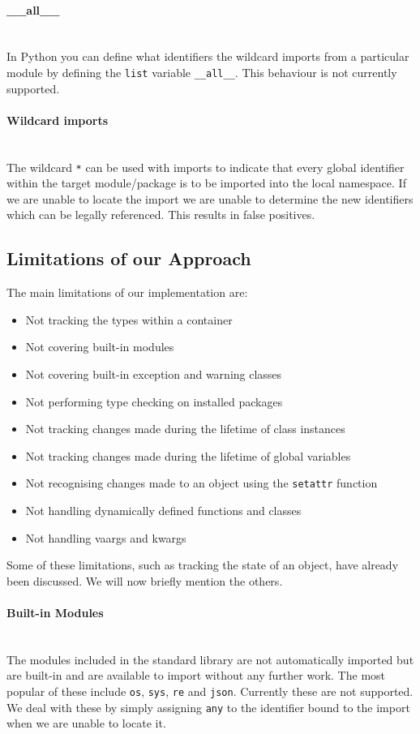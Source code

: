 \documentclass[12pt, titlepage]{article}
\begin{document}
\paragraph*{\_\_all\_\_}\mbox{} \\
In Python you can define what identifiers the wildcard imports from a particular module by defining the \texttt{list} variable \texttt{\_\_all\_\_}. This behaviour is not currently supported.

\paragraph*{Wildcard imports}\mbox{} \\
The wildcard \texttt{*} can be used with imports to indicate that every global identifier within the target module/package is to be imported into the local namespace. If we are unable to locate the import we are unable to determine the new identifiers which can be legally referenced. This results in false positives.


\subsection{Limitations of our Approach}
The main limitations of our implementation are:
\begin{itemize}
	\item Not tracking the types within a container
	\item Not covering built-in modules
	\item Not covering built-in exception and warning classes
	\item Not performing type checking on installed packages
	\item Not tracking changes made during the lifetime of class instances
	\item Not tracking changes made during the lifetime of global variables
	\item Not recognising changes made to an object using the \texttt{setattr} function
	\item Not handling dynamically defined functions and classes
	\item Not handling vaargs and kwargs
\end{itemize}
Some of these limitations, such as tracking the state of an object, have already been discussed. We will now briefly mention the others.

\paragraph*{Built-in Modules}\mbox{} \\
The modules included in the standard library are not automatically imported but are built-in and are available to import without any further work. The most popular of these include \texttt{os}, \texttt{sys}, \texttt{re} and \texttt{json}. Currently these are not supported. We deal with these by simply assigning \texttt{any} to the identifier bound to the import when we are unable to locate it.
\end{document}
